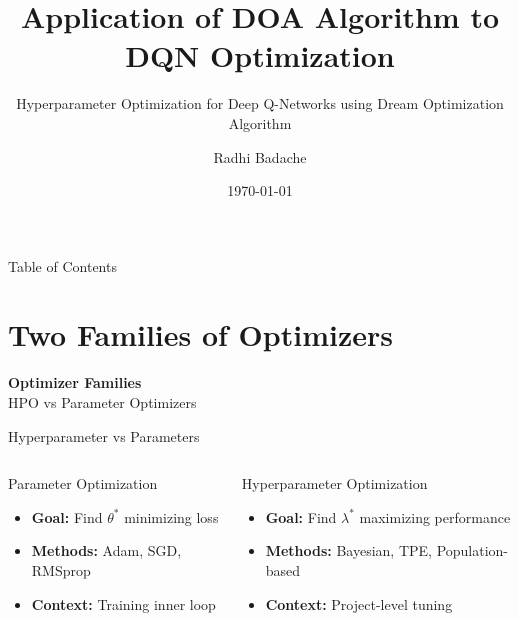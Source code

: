 \documentclass[aspectratio=169,11pt]{beamer}
\title[DOA-DQN]{Application of DOA Algorithm to DQN Optimization}
\subtitle{Hyperparameter Optimization for Deep Q-Networks using Dream Optimization Algorithm}
\author{Radhi Badache}
\institute{Research Project -- Statistics for Data Science}
\date{\today}
\begin{document}
	
	
	\begin{frame}[plain]
		\titlepage
	\end{frame}
	
	
	\begin{frame}{Table of Contents}
		\tableofcontents
	\end{frame}
	
	
	
	
	\section{Two Families of Optimizers}
	
	\begin{frame}[plain]
		\centering
		\vspace{2.5cm}
		{\Huge\textcolor{bg=mainblue}{\textbf{Optimizer Families \\}}}
		\vspace{0.8cm}
		{\Large\textcolor{bg=mainblue}{HPO vs Parameter Optimizers}}
		\normalsize
	\end{frame}
	
	\begin{frame}{Hyperparameter vs Parameters}
		\begin{columns}[T]
			\begin{block}{Parameter Optimization}
				\footnotesize
				\begin{itemize}
					\item \textbf{Goal:} Find $\theta^*$ minimizing loss
					\item \textbf{Methods:} Adam, SGD, RMSprop
					\item \textbf{Context:} Training inner loop
				\end{itemize}
			\end{block}
			
			\begin{block}{Hyperparameter Optimization}
				\footnotesize
				\begin{itemize}
					\item \textbf{Goal:} Find $\lambda^*$ maximizing performance
					\item \textbf{Methods:} Bayesian, TPE, Population-based
					\item \textbf{Context:} Project-level tuning
				\end{itemize}
			\end{block}
		\end{columns}
	\end{frame}
	
\end{document}
